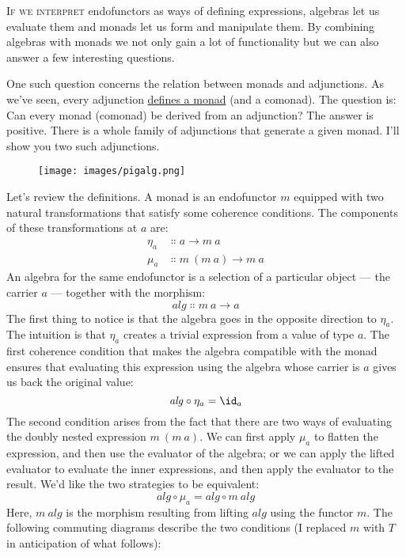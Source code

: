 
\lettrine[lhang=0.17]{I}{f we interpret} endofunctors as ways of defining expressions, algebras
let us evaluate them and monads let us form and manipulate them. By
combining algebras with monads we not only gain a lot of functionality
but we can also answer a few interesting questions.

One such question concerns the relation between monads and adjunctions.
As we've seen, every adjunction \hyperref[monads-categorically]{defines
  a monad} (and a comonad). The question is: Can every monad (comonad) be
derived from an adjunction? The answer is positive. There is a whole
family of adjunctions that generate a given monad. I'll show you two
such adjunctions.

\begin{figure}[H]
  \centering
  \texttt{[image: images/pigalg.png]}
\end{figure}

\noindent
Let's review the definitions. A monad is an endofunctor $m$
equipped with two natural transformations that satisfy some coherence
conditions. The components of these transformations at $a$ are:
\begin{align*}
  \eta_a & \Colon a \to m\ a         \\
  \mu_a  & \Colon m\ (m\ a) \to m\ a
\end{align*}
An algebra for the same endofunctor is a selection of a particular
object --- the carrier $a$ --- together with the morphism:
\[\mathit{alg} \Colon m\ a \to a\]
The first thing to notice is that the algebra goes in the opposite
direction to $\eta_a$. The intuition is that $\eta_a$ creates a
trivial expression from a value of type $a$. The first coherence
condition that makes the algebra compatible with the monad ensures that
evaluating this expression using the algebra whose carrier is $a$
gives us back the original value:
\[\mathit{alg} \circ \eta_a = \id_a\]
The second condition arises from the fact that there are two ways of
evaluating the doubly nested expression $m\ (m\ a)$. We can first
apply $\mu_a$ to flatten the expression, and then use the evaluator
of the algebra; or we can apply the lifted evaluator to evaluate the
inner expressions, and then apply the evaluator to the result. We'd like
the two strategies to be equivalent:
\[\mathit{alg} \circ \mu_a = \mathit{alg} \circ m\ \mathit{alg}\]
Here, $m\ \mathit{alg}$ is the morphism resulting from lifting
$\mathit{alg}$ using the functor $m$. The following commuting
diagrams describe the two conditions (I replaced $m$ with
$T$ in anticipation of what follows):


